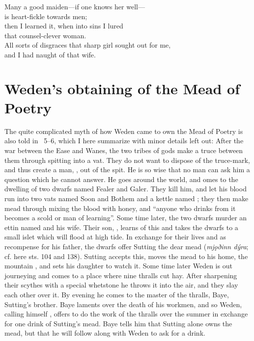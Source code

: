 \bvb Many a good maiden—if one knows her well— \\
is heart-fickle towards men; \\
then I learned it, when into sins I lured \\
that counsel-clever woman. \\
All sorts of disgraces that sharp girl sought out for me, \\
and I had naught of that wife.\evb
\evg

\sectionline

\section{Weden’s obtaining of the Mead of Poetry}

The quite complicated myth of how Weden came to own the Mead of Poetry is also told in \Skaldskaparmal\ 5–6, which I here summarize with minor details left out: After the war between the Ease and Wanes, the two tribes of gods make a truce between them through spitting into a vat. They do not want to dispose of the truce-mark, and thus create a man, , out of the spit. He is so wise that no man can ask him a question which he cannot answer. He goes around the world, and omes to the dwelling of two dwarfs named Fealer and Galer. They kill him, and let his blood run into two vats named Soon and Bothem and a kettle named ; they then make mead through mixing the blood with honey, and “anyone who drinks from it becomes a scold or man of learning”.
Some time later, the two dwarfs murder an ettin named  and his wife. Their son, , learns of this and takes the dwarfs to a small islet which will flood at high tide. In exchange for their lives and as recompense for his father, the dwarfs offer Sutting the dear mead (\emph{mjǫðinn dýra}; cf. here sts. 104 and 138). Sutting accepts this, moves the mead to his home, the mountain , and sets his daughter  to watch it.
Some time later Weden is out journeying and comes to a place where nine thralls cut hay. After sharpening their scythes with a special whetstone he throws it into the air, and they slay each other over it. By evening he comes to the master of the thralls, Baye, Sutting’s brother. Baye laments over the death of his workmen, and so Weden, calling himself , offers to do the work of the thralls over the summer in exchange for one drink of Sutting’s mead. Baye tells him that Sutting alone owns the mead, but that he will follow along with Weden to ask for a drink.
